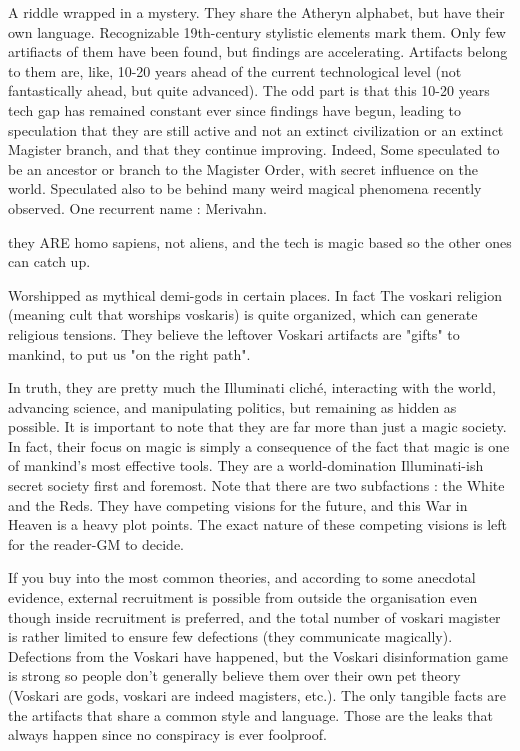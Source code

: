 A riddle wrapped in a mystery. They share the Atheryn alphabet, but have their own language. Recognizable 19th-century stylistic elements mark them. Only few artifiacts of them have been found, but findings are accelerating. Artifacts belong to them are, like, 10-20 years ahead of the current technological level (not fantastically ahead, but quite advanced). The odd part is that this 10-20 years tech gap has remained constant ever since findings have begun, leading to speculation that they are still active and not an extinct civilization or an extinct Magister branch, and that they continue improving. Indeed, Some speculated to be an ancestor or branch to the Magister Order, with secret influence on the world. Speculated also to be behind many weird magical phenomena recently observed. One recurrent name : Merivahn.

they ARE homo sapiens, not aliens, and the tech is magic based so the other ones can catch up.
	
Worshipped as mythical demi-gods in certain places. In fact The voskari religion (meaning cult that worships voskaris) is quite organized, which can generate religious tensions. They believe the leftover Voskari artifacts are "gifts" to mankind, to put us "on the right path". 

In truth, they are pretty much the Illuminati cliché, interacting with the world, advancing science, and manipulating politics, but remaining as hidden as possible. It is important to note that they are far more than just a magic society. In fact, their focus on magic is simply a consequence of the fact that magic is one of mankind's most effective tools. They are a world-domination Illuminati-ish secret society first and foremost.
    Note that there are two subfactions : the White and the Reds. They have competing visions for the future, and this War in Heaven is a heavy plot points. The exact nature of these competing visions is left for the reader-GM to decide.

If you buy into the most common theories, and according to some anecdotal evidence, external recruitment is possible from outside the organisation even though inside recruitment is preferred, and the total number of voskari magister is rather limited to ensure few defections (they communicate magically). Defections from the Voskari have happened, but the Voskari disinformation game is strong so people don't generally believe them over their own pet theory (Voskari are gods, voskari are indeed magisters, etc.). The only tangible facts are the artifacts that share a common style and language. Those are the leaks that always happen since no conspiracy is ever foolproof.





